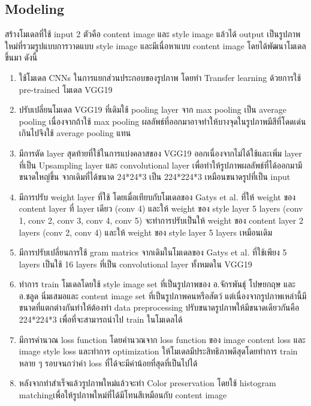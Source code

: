 \documentclass[12pt,oneside,openright,a4paper]{cpe-thai-project}
\begin{document}
\subsection{Modeling}
\par\setlength{\parindent}{5ex}
สร้างโมเดลที่ใช้ input 2 ตัวคือ content image และ style image แล้วได้ output เป็นรูปภาพใหม่ที่รวมรูปแบบการวาดแบบ style image และมีเนื่อหาแบบ content image โดยได้พัฒนาโมเดลขึ้นมา ดังนี้

\begin{enumerate}
  \item ใช้โมเดล CNNs ในการแยกส่วนประกอบของรูปภาพ โดยทำ Transfer learning ด้วยการใช้ pre-trained โมเดล VGG19 
  \item ปรับเปลี่ยนโมเดล VGG19 ที่เดิมใช้ pooling layer จาก max pooling เป็น average pooling เนื่องจากถ้าใช้ max pooling ผลลัพธ์ที่ออกมาอาจทำให้บางจุดในรูปภาพมีสีที่โดดเด่นเกินไปจึงใช้  average pooling แทน
  \item มีการตัด layer สุดท้ายที่ใช้ในการแบ่งคลาสของ VGG19 ออกเนื่องจากไม่ได้ใช้และเพิ่ม layer ที่เป็น Upsampling layer และ convolutional layer เพื่อทำให้รูปภาพผลลัพธ์ที่ได้ออกมามีขนาดใหญ่ขึ้น จากเดิมที่ได้ขนาด 24*24*3 เป็น 224*224*3 เหมือนขนาดรูปที่เป็น input
  \item มีการปรับ weight layer ที่ใช้ โดยเมื่อเทียบกับโมเดลของ Gatys  et al. \cite{gatys2015neural} ที่ให้ weight ของ content layer ที่ layer เดียว (conv 4) และให้ weight ของ style layer 5 layers (conv 1, conv 2, conv 3, conv 4, conv 5) จะทำการปรับเป็นให้ weight ของ content layer 2 layers (conv 2, conv 4) และให้ weight ของ style layer 5 layers เหมือนเดิม 
  \item มีการปรับเปลี่ยนการใช้ gram matrics จากเดิมในโมเดลของ Gatys  et al. \cite{gatys2015neural} ที่ใช้เพียง 5 layers เป็นใช้ 16 layers ที่เป็น convolutional layer ทั้งหมดใน VGG19
  \item ทำการ train โมเดลโดยใช้ style image set ที่เป็นรูปภาพของ อ.จักรพันธุ์ โปษยกฤษ และ อ.ชลูด นิ่มเสมอและ content image set ที่เป็นรูปภาพคนหรือสัตว์ แต่เนื่องจากรูปภาพเหล่านี้มีขนาดที่แตกต่างกันทำให้ต้องทำ data preprocessing ปรับขนาดรูปภาพให้มีขนาดเดียวกันคือ 224*224*3 เพื่อที่จะสามารถนำไป train ในโมเดลได้
  \item มีการคำนวณ loss function โดยคำนวณจาก loss function ของ image content loss และ image style loss และทำการ optimization ให้โมเดลมีประสิทธิภาพดีสุดโดยทำการ train หลาย ๆ รอบจนกว่าค่า loss ที่ได้จะมีค่าน้อยที่สุดที่เป็นไปได้
  \item หลังจากทำสำเร็จแล้วรูปภาพใหม่แล้วจะทำ Color preservation โดยใช้ histogram matchingเพื่อให้รูปภาพใหม่ที่ได้มีโทนสีเหมือนกับ content image
\end{enumerate}
\end{document}
